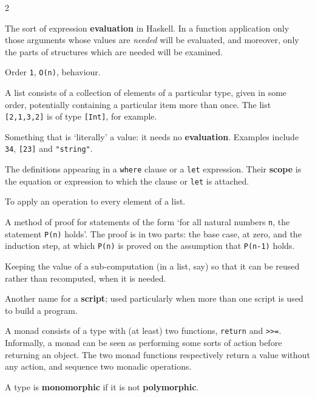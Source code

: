 \begin{multicols}{2}
{
The sort of expression \textbf{evaluation} in Haskell. In a function
application only those arguments whose values are {\em needed\/} will be
evaluated, and moreover, only the parts of structures which are needed
will be examined.

Order \texttt{1}, \texttt{O(n)}, behaviour.

A list consists of a collection of elements of a particular type, given in
some order, potentially containing a particular item more than once.
The list \texttt{[2,1,3,2]} is of type \texttt{[Int]}, for example.

Something that is `literally' a value: it needs no \textbf{evaluation}. Examples
include \texttt{34}, \texttt{[23]} and \texttt{"string"}.

The definitions appearing in a \texttt{where} clause or a \texttt{let} expression.
Their \textbf{scope} is
the equation or expression to which the clause or \texttt{let} is attached.

 To apply an operation to every element of a list.

A method of proof for statements of the form `for all natural numbers 
\texttt{n}, the statement \texttt{P(n)} holds'. 
\itempar
The proof is in two parts: the
base case, at zero, and the induction step, at which \texttt{P(n)} is proved
on the assumption that \texttt{P(n-1)} holds.

Keeping the value of a sub-computation (in a list, say)
so that it can be reused
rather than recomputed, when it is needed.

Another name for a \textbf{script}; used particularly when more than one script
is used to build a program.

A monad consists of a type with (at least) two functions, \texttt{return} and
\texttt{>>=}. Informally, a monad can be seen as performing some sorts of action
before returning an object. The two monad functions
respectively return a value without any action, and sequence two
monadic operations.

 
A type is \textbf{monomorphic} if it is not \textbf{polymorphic}.

}
\end{multicols}
